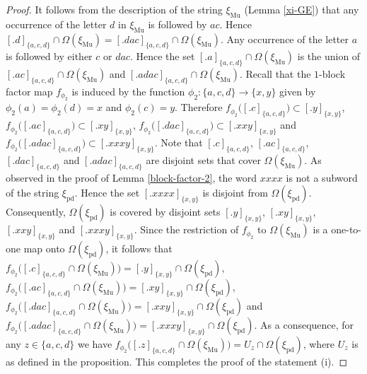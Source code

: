 \documentclass[10pt,a4paper]{amsart}
\def\Om{\Omega}
\def\xiGE{\xi_{\mathrm{Mu}}}
\def\xipd{\xi_{\mathrm{pd}}}
\begin{document}
\begin{proof}
It follows from the description of the string $\xiGE$ (Lemma \ref{xi-GE}) 
that any occurrence of the letter $d$ in $\xiGE$ is followed by $ac$.  
Hence $[.d]_{\{a,c,d\}}\cap\Om(\xiGE)=[.dac]_{\{a,c,d\}}\cap\Om(\xiGE)$.  
Any occurrence of the letter $a$ is followed by either $c$ or $dac$.  Hence 
the set $[.a]_{\{a,c,d\}}\cap\Om(\xiGE)$ is the union of 
$[.ac]_{\{a,c,d\}}\cap\Om(\xiGE)$ and $[.adac]_{\{a,c,d\}}\cap\Om(\xiGE)$.  
Recall that the $1$-block factor map $f_{\phi_2}$ is induced by the 
function $\phi_2:\{a,c,d\}\to\{x,y\}$ given by $\phi_2(a)=\phi_2(d)=x$ and 
$\phi_2(c)=y$.  Therefore $f_{\phi_2}\bigl([.c]_{\{a,c,d\}}\bigr)\subset 
[.y]_{\{x,y\}}$, $f_{\phi_2}\bigl([.ac]_{\{a,c,d\}}\bigr)\subset 
[.xy]_{\{x,y\}}$, $f_{\phi_2}\bigl([.dac]_{\{a,c,d\}}\bigr)\subset 
[.xxy]_{\{x,y\}}$ and $f_{\phi_2}\bigl([.adac]_{\{a,c,d\}}\bigr)\subset 
[.xxxy]_{\{x,y\}}$.  Note that $[.c]_{\{a,c,d\}}$, $[.ac]_{\{a,c,d\}}$, 
$[.dac]_{\{a,c,d\}}$ and $[.adac]_{\{a,c,d\}}$ are disjoint sets that cover 
$\Om(\xiGE)$.  As observed in the proof of Lemma \ref{block-factor-2}, the 
word $xxxx$ is not a subword of the string $\xipd$.  Hence the set 
$[.xxxx]_{\{x,y\}}$ is disjoint from $\Om(\xipd)$.  Consequently, 
$\Om(\xipd)$ is covered by disjoint sets $[.y]_{\{x,y\}}$, 
$[.xy]_{\{x,y\}}$, $[.xxy]_{\{x,y\}}$ and $[.xxxy]_{\{x,y\}}$.  Since the 
restriction of $f_{\phi_2}$ to $\Om(\xiGE)$ is a one-to-one map onto 
$\Om(\xipd)$, it follows that 
$f_{\phi_2}\bigl([.c]_{\{a,c,d\}}\cap\Om(\xiGE)\bigr)=
[.y]_{\{x,y\}}\cap\Om(\xipd)$, 
$f_{\phi_2}\bigl([.ac]_{\{a,c,d\}}\cap\Om(\xiGE)\bigr)= 
[.xy]_{\{x,y\}}\cap\Om(\xipd)$, 
$f_{\phi_2}\bigl([.dac]_{\{a,c,d\}}\cap\Om(\xiGE)\bigr)=
[.xxy]_{\{x,y\}}\cap\Om(\xipd)$ and 
$f_{\phi_2}\bigl([.adac]_{\{a,c,d\}}\cap\Om(\xiGE)\bigr)=
[.xxxy]_{\{x,y\}}\cap\Om(\xipd)$.  As a consequence, for any 
$z\in\{a,c,d\}$ we have 
$f_{\phi_2}\bigl([.z]_{\{a,c,d\}}\cap\Om(\xiGE)\bigr)=U_z\cap\Om(\xipd)$, 
where $U_z$ is as defined in the proposition.  This completes the proof of 
the statement (i).


\end{proof}
\end{document}
